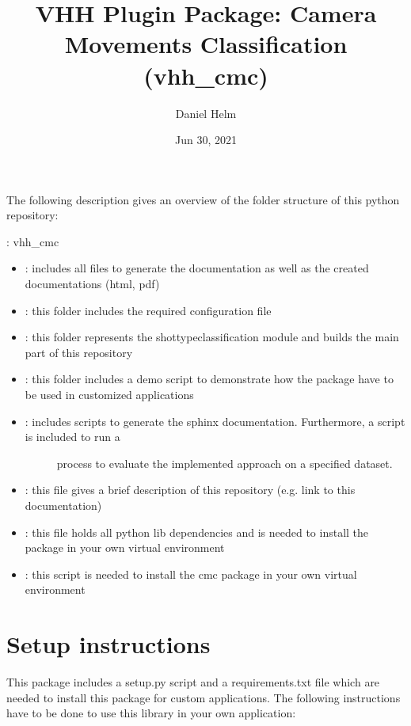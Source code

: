 \documentclass[letterpaper,10pt,english,openany,oneside]{sphinxmanual}
\title{VHH Plugin Package: Camera Movements Classification (vhh\_cmc)}
\date{Jun 30, 2021}
\author{Daniel Helm}
\begin{document}
\pagestyle{empty}
\sphinxmaketitle
\pagestyle{plain}
\sphinxtableofcontents
\pagestyle{normal}
\label{\detokenize{index::doc}}


The following description gives an overview of the folder structure of this python repository:

: vhh\_cmc
\begin{itemize}
\item {} 
: includes all files to generate the documentation as well as the created documentations (html, pdf)

\item {} 
: this folder includes the required configuration file

\item {} 
: this folder represents the shot\sphinxhyphen{}type\sphinxhyphen{}classification module and builds the main part of this repository

\item {} 
: this folder includes a demo script to demonstrate how the package have to be used in customized applications

\item {} \begin{description}
\item[{: includes scripts to generate the sphinx documentation. Furthermore, a script is included to run a}] \leavevmode
process to evaluate the implemented approach on a specified dataset.

\end{description}

\item {} 
: this file gives a brief description of this repository (e.g. link to this documentation)

\item {} 
: this file holds all python lib dependencies and is needed to install the package in your own virtual environment

\item {} 
: this script is needed to install the cmc package in your own virtual environment

\end{itemize}


\chapter{Setup  instructions}
\label{\detokenize{index:setup-instructions}}
This package includes a setup.py script and a requirements.txt file which are needed to install this package for custom
applications. The following instructions have to be done to use this library in your own application:
\end{document}
